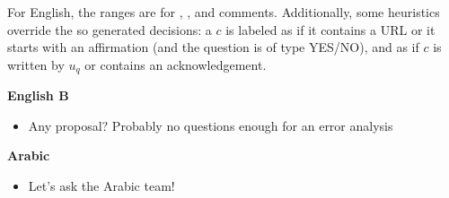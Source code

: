 For English, the ranges are  for \good, \pot, and \bad 
comments. Additionally, some heuristics override the so generated decisions: a 
$c$ is labeled as \good if
\Ni it contains a URL or
\Nii it starts with an affirmation (and the question is of type YES/NO), and as 
\bad if $c$ is written by $u_q$ or contains an acknowledgement.

\textbf{English B}
\begin{itemize}
 \item Any proposal? Probably no questions enough for an error analysis
\end{itemize}



\textbf{Arabic}

\begin{itemize}
 \item Let's ask the Arabic team!
\end{itemize}

% 
% 
% 

% 
% 
% 
% 
